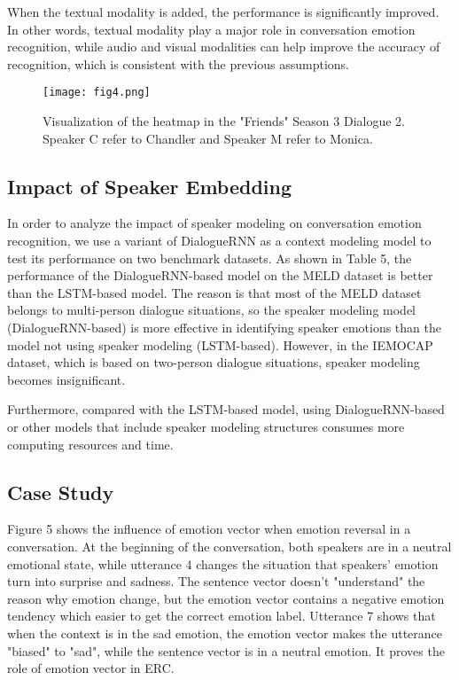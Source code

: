 When the textual modality is added, the performance is significantly improved. In other words, textual modality play a major role in conversation emotion recognition, while audio and visual modalities can help improve the accuracy of recognition, which is consistent with the previous assumptions.
\begin{figure}[t]
	\centering
	\texttt{[image: fig4.png]} 
	\caption{Visualization of the heatmap in the "Friends" Season 3 Dialogue 2. Speaker C refer to Chandler and Speaker M refer to Monica.}
	\label{fig4}
\end{figure}

\subsection{Impact of Speaker Embedding}
In order to analyze the impact of speaker modeling on conversation emotion recognition, we use a variant of DialogueRNN as a context modeling model to test its performance on two benchmark datasets. As shown in Table 5, the performance of the DialogueRNN-based model on the MELD dataset is better than the LSTM-based model. The reason is that most of the MELD dataset belongs to multi-person dialogue situations, so the speaker modeling model (DialogueRNN-based) is more effective in identifying speaker emotions than the model not using speaker modeling (LSTM-based). However, in the IEMOCAP dataset, which is based on two-person dialogue situations, speaker modeling becomes insignificant.

Furthermore, compared with the LSTM-based model, using DialogueRNN-based or other models that include speaker modeling structures consumes more computing resources and time.

\subsection{Case Study}
Figure 5 shows the influence of emotion vector when emotion reversal in a conversation. At the beginning of the conversation, both speakers are in a neutral emotional state, while utterance 4 changes the situation that speakers' emotion turn into surprise and sadness. The sentence vector doesn't "understand" the reason why emotion change, but the emotion vector contains a negative emotion tendency which easier to get the correct emotion label. Utterance 7 shows that when the context is in the sad emotion, the emotion vector makes the utterance "biased" to "sad", while the sentence vector is in a neutral emotion. It proves the role of emotion vector in ERC.
